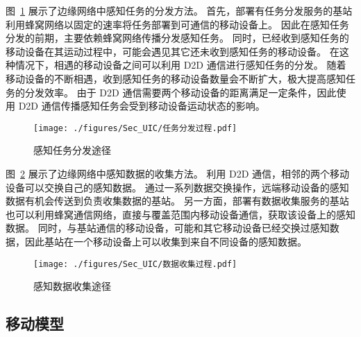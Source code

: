 图~\ref{Figure_PropagationProcedure} 展示了边缘网络中感知任务的分发方法。
首先，部署有任务分发服务的基站利用蜂窝网络以固定的速率将任务部署到可通信的移动设备上。
因此在感知任务分发的前期，主要依赖蜂窝网络传播分发感知任务。
同时，已经收到感知任务的移动设备在其运动过程中，可能会遇见其它还未收到感知任务的移动设备。
在这种情况下，相遇的移动设备之间可以利用 D2D 通信进行感知任务的分发。
随着移动设备的不断相遇，收到感知任务的移动设备数量会不断扩大，极大提高感知任务的分发效率。
由于 D2D 通信需要两个移动设备的距离满足一定条件，因此使用 D2D 通信传播感知任务会受到移动设备运动状态的影响。

\begin{figure}[!h]
  \centering
  \texttt{[image: ./figures/Sec\_UIC/任务分发过程.pdf]}
  \vspace{-0.5em}
  \caption{感知任务分发途径}
  \vspace{-1em}
  \label{Figure_PropagationProcedure}
\end{figure}

图~\ref{Figure_FeedbacksCollection} 展示了边缘网络中感知数据的收集方法。
利用 D2D 通信，相邻的两个移动设备可以交换自己的感知数据。
通过一系列数据交换操作，远端移动设备的感知数据有机会传送到负责收集数据的基站。
另一方面，部署有数据收集服务的基站也可以利用蜂窝通信网络，直接与覆盖范围内移动设备通信，获取该设备上的感知数据。
同时，与基站通信的移动设备，可能和其它移动设备已经交换过感知数据，因此基站在一个移动设备上可以收集到来自不同设备的感知数据。


\begin{figure}[!h]
  \centering
  \texttt{[image: ./figures/Sec\_UIC/数据收集过程.pdf]}
  \vspace{-0.5em}
  \caption{感知数据收集途径}
  \vspace{-1.5em}
  \label{Figure_FeedbacksCollection}
\end{figure}

\subsection{移动模型}

